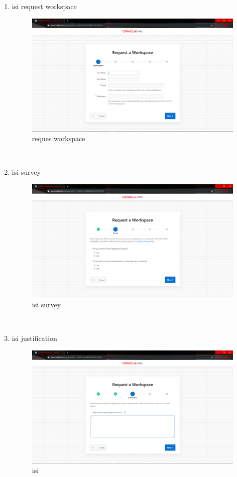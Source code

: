 \begin{enumerate}
\item isi request workspace
\begin{figure}[H]
        \centerline{\includegraphics[scale=0.2]{figures/3}}
        \caption{reques workspace}
		\label{langkah2}
\end{figure} \\


\item isi survey

\begin{figure}[H]
    \centering
    \includegraphics[scale=0.2]{figures/4}
    \caption{isi survey}
    \label{Figureanaconda3}
\end{figure} \\


\item isi justification

\begin{figure}[H]
    \centering
    \includegraphics[scale=0.2]{figures/5}
    \caption{isi }
    \label{Figureanaconda4}
\end{figure} \\



\end{enumerate}
